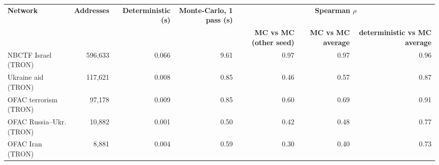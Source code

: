 \begin{tabular}{lrrrrrr}
\toprule
\textbf{Network} & \textbf{Addresses} & \textbf{Deterministic (s)} & \textbf{Monte-Carlo, 1 pass (s)} & \multicolumn{3}{c}{\textbf{Spearman $\rho$}} \\
\cmidrule(lr){5-7}
 & & & & \textbf{MC vs MC (other seed)} & \textbf{MC vs MC average} & \textbf{deterministic vs MC average} \\
\midrule
NBCTF Israel (TRON) & 596,633 & 0.066 & 9.61 & 0.97 & 0.97 & 0.96 \\
Ukraine aid (TRON) & 117,621 & 0.008 & 0.85 & 0.46 & 0.57 & 0.87 \\
OFAC terrorism (TRON) & 97,178 & 0.009 & 0.85 & 0.60 & 0.69 & 0.91 \\
OFAC Russia--Ukr. (TRON) & 10,882 & 0.001 & 0.50 & 0.42 & 0.48 & 0.77 \\
OFAC Iran (TRON) & 8,881 & 0.004 & 0.59 & 0.30 & 0.40 & 0.73 \\
\bottomrule
\end{tabular}
